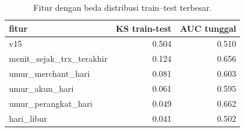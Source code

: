 \begin{table}[ht]
\centering\small
\begin{tabular}{lrr}
\toprule
fitur & KS train-test & AUC tunggal \\
\midrule
v15 & 0.504 & 0.510 \\
menit\_sejak\_trx\_terakhir & 0.124 & 0.656 \\
umur\_merchant\_hari & 0.081 & 0.603 \\
umur\_akun\_hari & 0.061 & 0.595 \\
umur\_perangkat\_hari & 0.049 & 0.662 \\
hari\_libur & 0.041 & 0.502 \\
\bottomrule
\end{tabular}
\caption{Fitur dengan beda distribusi train–test terbesar.}
\label{tab:t2_audit_ks}
\end{table}
